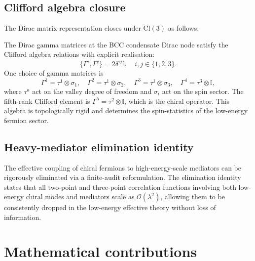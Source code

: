 \subsection{Clifford algebra closure}
The Dirac matrix representation closes under $\mathrm{Cl}(3)$ as follows:
\begin{theorem}
\label{thm:clifford}
The Dirac gamma matrices at the BCC condensate Dirac node satisfy the Clifford algebra
relations with explicit realisation:
\begin{equation}
\{\Gamma^i, \Gamma^j\} = 2\delta^{ij}\mathbb{I}, \quad i,j \in \{1,2,3\}.
\label{eq:clifford}
\end{equation}
One choice of gamma matrices is
\begin{equation}
\Gamma^1 = \tau^1 \otimes \sigma_1, \quad
\Gamma^2 = \tau^1 \otimes \sigma_2, \quad
\Gamma^3 = \tau^1 \otimes \sigma_3, \quad
\Gamma^4 = \tau^3 \otimes \mathbb{I},
\end{equation}
where $\tau^a$ act on the valley degree of freedom and $\sigma_i$ act on the spin sector.
The fifth-rank Clifford element is $\Gamma^5 = \tau^2 \otimes \mathbb{I}$, which is the chiral
operator. This algebra is topologically rigid and determines the spin-statistics of the
low-energy fermion sector.
\end{theorem}

\subsection{Heavy-mediator elimination identity}
\begin{theorem}
\label{thm:heavy_med}
The effective coupling of chiral fermions to high-energy-scale mediators can be rigorously
eliminated via a finite-audit reformulation. The elimination identity states that all
two-point and three-point correlation functions involving both low-energy chiral modes and
mediators scale as $\mathcal{O}(\lambda^2)$, allowing them to be consistently dropped in the
low-energy effective theory without loss of information.
\end{theorem}

\section{Mathematical contributions}

